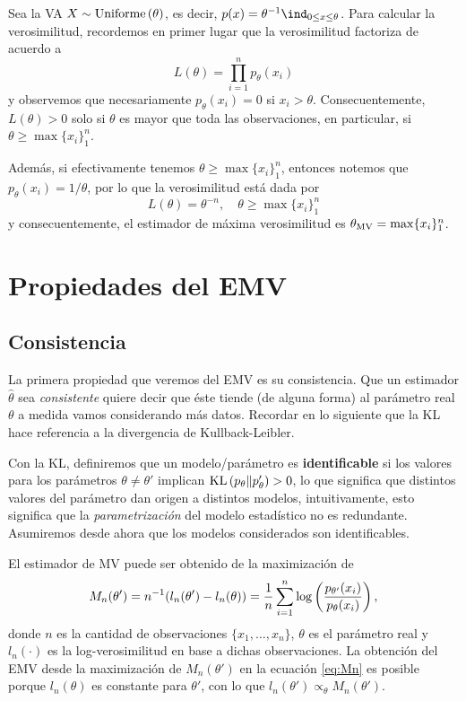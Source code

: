 \begin{example}
	Sea la VA $X\sim\text{Uniforme}\left(\theta\right)$, es decir, $p(x) = \theta^{-1} \ind_{0\leq x \leq \theta}$. Para calcular la verosimilitud, recordemos en primer lugar que la verosimilitud factoriza de acuerdo a  
	\begin{equation}
		L(\theta) = \prod_{i=1}^n p_\theta(x_i)
	\end{equation}
	y observemos que necesariamente $p_\theta(x_i) = 0$ si $x_i>\theta$. Consecuentemente, $L(\theta)>0$ solo si $\theta$ es mayor que toda las observaciones, en particular, si $\theta\geq\max\{x_i\}_1^n$.

	Además, si efectivamente tenemos $\theta\geq\max\{x_i\}_1^n$, entonces notemos que $p_\theta(x_i) = 1/\theta$, por lo que la verosimilitud está dada por
		\begin{equation}
		L(\theta) = \theta^{-n}, \quad \theta\geq\max\{x_i\}_1^n
	\end{equation}
	y consecuentemente, el estimador de máxima verosimilitud es ${\theta_\text{MV}} = \max\{x_i\}_1^n$.
\end{example}

\section{Propiedades del EMV} 
\label{sec:propiedades_EMV}

\subsection{Consistencia} 

La primera propiedad que veremos del EMV es su consistencia. Que un estimador $\hat\theta$ sea \textit{consistente} quiere decir que éste tiende (de alguna forma) al parámetro real $\theta$ a medida vamos considerando más datos. Recordar en lo siguiente que la KL hace referencia a la divergencia de Kullback-Leibler.


 Con la KL, definiremos que un modelo/parámetro es \textbf{identificable} si los valores para los parámetros $\theta\neq\theta'$ implican $\text{KL}\left(p_\theta\middle\|p_\theta'\right)>0$, lo que significa que distintos valores del parámetro dan origen a distintos modelos, intuitivamente, esto significa que la \emph{parametrización} del modelo estadístico no es redundante. Asumiremos desde ahora que los modelos considerados son identificables.

El estimador de MV puede ser obtenido de la maximización de
\begin{equation}
\label{eq:Mn}
 	M_n (\theta') = n^{-1} (l_n(\theta') - l_n(\theta))  = \frac{1}{n} \sum_{i=1}^n \log\left(\frac{p_{\theta'}(x_i)}{p_{\theta}(x_i)}\right),
 \end{equation} 
 donde $n$ es la cantidad de observaciones $\{x_1,\ldots,x_n\}$, $\theta$ es el parámetro real y $l_n(\cdot)$ es la log-verosimilitud en base a dichas observaciones. La obtención del EMV desde la maximización de $M_n (\theta')$ en la ecuación \eqref{eq:Mn} es posible porque $l_n(\theta)$ es constante para $\theta'$, con lo que $l_n(\theta')\propto_{\theta}M_n (\theta')$. 
 
